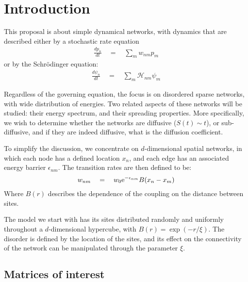 \chapter{Introduction}


This proposal is about simple dynamical networks, with dynamics
that are described either by a stochastic rate equation
%
\begin{align}
  \frac{dp_n}{dt} \quad = \quad \sum_m w_{nm}p_m
\end{align}
%
or by the Schr\"{o}dinger equation:
%
\begin{align}
  \frac{d\psi_n}{dt} \quad = \quad \sum_m \mathcal{H}_{nm}\psi_m
\end{align}
%

Regardless of the governing equation, the focus is
on disordered sparse networks, with wide distribution of energies. 
Two related aspects of these networks will be studied: their energy spectrum,
and their spreading properties. More specifically, we wish to determine
whether the networks are diffusive ($S(t)\sim t$), or sub-diffusive, and
if they are indeed diffusive, what is the diffusion coefficient. 




To simplify the discussion, we concentrate on $d$-dimensional spatial networks,
in which each node has a defined location $x_n$, and each edge has an associated 
energy barrier $\epsilon_{nm}$. The transition rates are then defined to be:
%
\begin{align}
w_{nm} \quad = \quad w_0 \mbox{e}^{-\epsilon_{nm}}B(x_n-x_m)
\end{align}
%
Where $B(r)$ describes the dependence of the coupling on the
distance between sites.


The model we start with has its sites distributed randomly and uniformly throughout
a $d$-dimensional hypercube, with $B(r) = \exp(-r/\xi)$. The disorder is defined by the location
of the sites, and its effect on the connectivity of the network can be manipulated through the 
parameter $\xi$. 



\section{Matrices of interest}\label{sec:matrix_categories}


